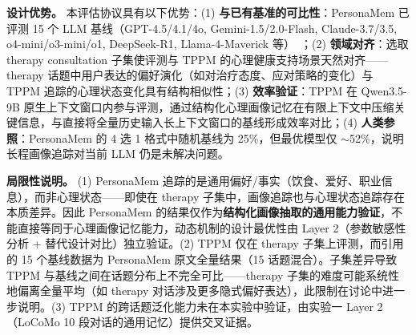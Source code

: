 \documentclass[12pt,a4paper]{article}
\begin{document}
\textbf{设计优势。}
本评估协议具有以下优势：(1) \textbf{与已有基准的可比性}：PersonaMem 已评测 15 个 LLM 基线（GPT-4.5/4.1/4o, Gemini-1.5/2.0-Flash, Claude-3.7/3.5, o4-mini/o3-mini/o1, DeepSeek-R1, Llama-4-Maverick 等）~\cite{jiang2025personamem}；(2) \textbf{领域对齐}：选取 therapy consultation 子集使评测与 TPPM 的心理健康支持场景天然对齐——therapy 话题中用户表达的偏好演化（如对治疗态度、应对策略的变化）与 TPPM 追踪的心理状态变化具有结构相似性；(3) \textbf{效率验证}：TPPM 在 Qwen3.5-9B 原生上下文窗口内参与评测，通过结构化心理画像记忆在有限上下文中压缩关键信息，与直接将全量历史输入长上下文窗口的基线形成效率对比；(4) \textbf{人类参照}：PersonaMem 的 4 选 1 格式中随机基线为 25\%，但最优模型仅 $\sim$52\%，说明长程画像追踪对当前 LLM 仍是未解决问题。

\textbf{局限性说明。} (1) PersonaMem 追踪的是通用偏好/事实（饮食、爱好、职业信息），而非心理状态——即使在 therapy 子集中，画像追踪也与心理状态追踪存在本质差异。因此 PersonaMem 的结果仅作为\textbf{结构化画像抽取的通用能力验证}，不能直接等同于心理画像记忆能力，动态机制的设计最优性由 Layer 2（参数敏感性分析 + 替代设计对比）独立验证。(2) TPPM 仅在 therapy 子集上评测，而引用的 15 个基线数据为 PersonaMem 原文全量结果（15 话题混合）。子集差异导致 TPPM 与基线之间在话题分布上不完全可比——therapy 子集的难度可能系统性地偏离全量平均（如 therapy 对话涉及更多隐式偏好表达），此限制在讨论中进一步说明。(3) TPPM 的跨话题泛化能力未在本实验中验证，由实验一 Layer 2（LoCoMo 10 段对话的通用记忆）提供交叉证据。
\end{document}
